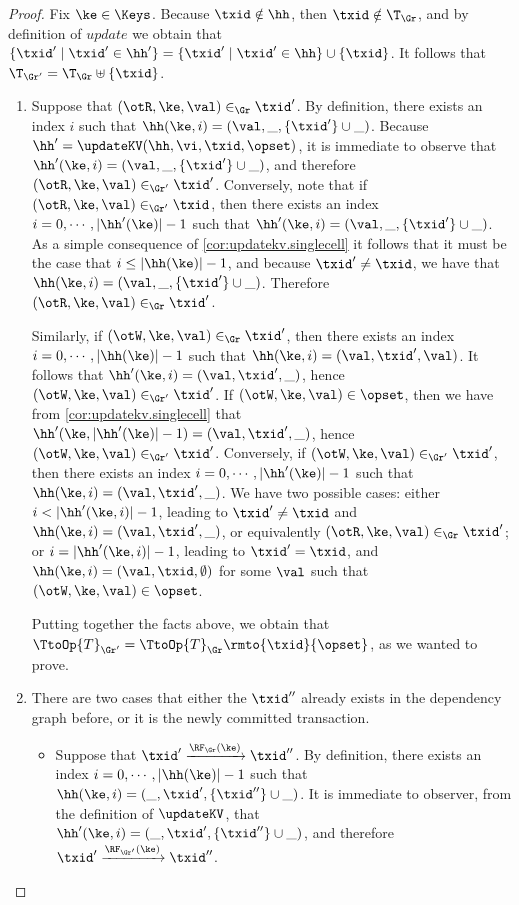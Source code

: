 \begin{proof}
Fix $\ke \in \Keys$. Because $\txid \notin \hh$, then $\txid \notin \T_{\Gr}$, 
and by definition of $update$ we obtain that $\{\txid' \mid \txid' \in \hh'\} = 
\{\txid' \mid \txid' \in \hh\} \cup \{\txid\}$. It follows that $\T_{\Gr'} = \T_{\Gr} \uplus \{\txid \}$.

\begin{enumerate}
\item Suppose that $(\otR, \ke, \val) \in_{\Gr} \txid'$. By definition, 
there exists an index $i$ such 
that $\hh(\ke, i) = (\val, \_, \{\txid'\} \cup \_)$. Because $\hh' = \updateKV(\hh, \vi, \txid, \opset)$, 
it is immediate to observe that $\hh'(\ke, i) = (\val, \_, \{\txid'\} \cup \_)$, and therefore 
$(\otR,\ke, \val) \in_{\Gr'} \txid'$. Conversely, note that if $(\otR, \ke, \val) \in_{\Gr'} \txid$, 
then there exists an index $i = 0,\cdots, \lvert \hh'(\ke) \rvert - 1$ such that 
$\hh'(\ke, i) = (\val, \_, \{\txid'\} \cup \_)$. As a simple consequence of \cref{cor:updatekv.singlecell} 
it follows that it must be the case that $i \leq \lvert \hh(\ke) \rvert - 1$, and because 
$\txid' \neq \txid$, we have that $\hh(\ke, i) = (\val, \_, \{\txid'\} \cup \_)$. Therefore 
$(\otR, \ke, \val) \in_{\Gr} \txid'$. 

Similarly, if $(\otW, \ke, \val) \in_{\Gr} \txid'$, 
then there exists an index $i=0,\cdots, \lvert \hh(\ke) \rvert - 1$ such that 
$\hh(\ke, i) = (\val, \txid', \val)$. It follows that $\hh'(\ke, i) = (\val, \txid', \_)$, hence 
$(\otW, \ke, \val) \in_{\Gr'} \txid'$. If $(\otW, \ke, \val) \in \opset$, then we 
have from \cref{cor:updatekv.singlecell} that $\hh'(\ke, \lvert \hh'(\ke) \rvert - 1) = (\val, \txid', \_)$, 
hence $(\otW, \ke, \val) \in_{\Gr'} \txid'$. 
Conversely, if $(\otW, \ke, \val) \in_{\Gr'} \txid'$, then there exists an index 
$i = 0, \cdots, \lvert \hh'(\ke) \rvert - 1$ such that $\hh(\ke, i) = (\val, \txid', \_)$. 
We have two possible cases: either $i < \lvert \hh'(\ke, i) \rvert - 1$, leading to  
$\txid' \neq \txid$ and $\hh(\ke, i) = (\val, \txid', \_)$, or equivalently 
$(\otR,\ke, \val) \in_{\Gr} \txid'$; or $i = \lvert \hh'(\ke, i) \rvert - 1$, 
leading to $\txid' = \txid$, and $\hh(\ke, i) = (\val, \txid, \emptyset)$ 
for some $\val$ such that $(\otW, \ke, \val) \in \opset$. 

Putting together the facts above, we obtain that $\TtoOp{T}_{\Gr'} = 
\TtoOp{T}_{\Gr}\rmto{\txid}{\opset}$, as we wanted to prove.

\item There are two cases that either the \( \txid'' \) already exists in the dependency graph before,
or it is the newly committed transaction.
\begin{itemize}
\item Suppose that $\txid' \xrightarrow{\RF_{\Gr}(\ke)} \txid''$. 
By definition, there exists an index $i = 0,\cdots, \lvert \hh(\ke) \rvert - 1$ 
such that $\hh(\ke, i) = (\_, \txid', \{\txid''\} \cup \_)$. It is immediate 
to observer, from the definition of $\updateKV$, that $\hh'(\ke, i) = (\_, \txid', \{\txid''\} \cup \_)$, 
and therefore $\txid' \xrightarrow{\RF_{\Gr'}(\ke)} \txid''$. 


\end{itemize}
\end{enumerate}
\end{proof}
